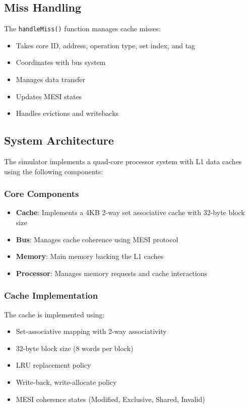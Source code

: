 \documentclass{article}
\begin{document}
\subsection{Miss Handling}
The \texttt{handleMiss()} function manages cache misses:
\begin{itemize}
    \item Takes core ID, address, operation type, set index, and tag
    \item Coordinates with bus system
    \item Manages data transfer
    \item Updates MESI states
    \item Handles evictions and writebacks
\end{itemize}

\subsection{System Architecture}
The simulator implements a quad-core processor system with L1 data caches using the following components:

\subsubsection{Core Components}
\begin{itemize}
    \item \textbf{Cache}: Implements a 4KB 2-way set associative cache with 32-byte block size
    \item \textbf{Bus}: Manages cache coherence using MESI protocol
    \item \textbf{Memory}: Main memory backing the L1 caches
    \item \textbf{Processor}: Manages memory requests and cache interactions
\end{itemize}

\subsubsection{Cache Implementation}
The cache is implemented using:
\begin{itemize}
    \item Set-associative mapping with 2-way associativity
    \item 32-byte block size (8 words per block)
    \item LRU replacement policy
    \item Write-back, write-allocate policy
    \item MESI coherence states (Modified, Exclusive, Shared, Invalid)
\end{itemize}
\end{document}
